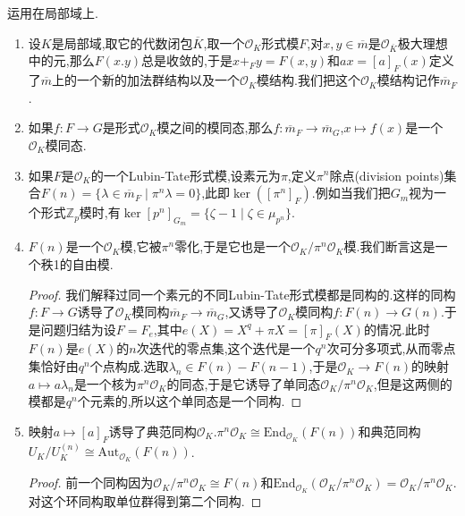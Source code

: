 运用在局部域上.
\begin{enumerate}
	\item 设$K$是局部域,取它的代数闭包$\overline{K}$,取一个$\mathscr{O}_K$形式模$F$,对$x,y\in\overline{m}$是$\mathscr{O}_{\overline{K}}$极大理想中的元,那么$F(x.y)$总是收敛的,于是$x+_Fy=F(x,y)$和$ax=[a]_F(x)$定义了$\overline{m}$上的一个新的加法群结构以及一个$\mathscr{O}_K$模结构.我们把这个$\mathscr{O}_K$模结构记作$\overline{m}_F$.
	\item 如果$f:F\to G$是形式$\mathscr{O}_K$模之间的模同态,那么$f:\overline{m}_F\to\overline{m}_G$,$x\mapsto f(x)$是一个$\mathscr{O}_K$模同态.
	\item 如果$F$是$\mathscr{O}_K$的一个Lubin-Tate形式模,设素元为$\pi$,定义$\pi^n$除点(division points)集合$F(n)=\{\lambda\in\overline{m}_F\mid\pi^n\lambda=0\}$,此即$\ker([\pi^n]_F)$.例如当我们把$G_m$视为一个形式$\mathbb{Z}_p$模时,有$\ker[p^n]_{G_m}=\{\zeta-1\mid\zeta\in\mu_{p^n}\}$.
	\item $F(n)$是一个$\mathscr{O}_K$模,它被$\pi^n$零化,于是它也是一个$\mathscr{O}_K/\pi^n\mathscr{O}_K$模.我们断言这是一个秩1的自由模.
	\begin{proof}
		
		我们解释过同一个素元的不同Lubin-Tate形式模都是同构的.这样的同构$f:F\to G$诱导了$\mathscr{O}_K$模同构$\overline{m}_F\to\overline{m}_G$,又诱导了$\mathscr{O}_K$模同构$f:F(n)\to G(n)$.于是问题归结为设$F=F_e$,其中$e(X)=X^q+\pi X=[\pi]_F(X)$的情况.此时$F(n)$是$e(X)$的$n$次迭代的零点集,这个迭代是一个$q^n$次可分多项式,从而零点集恰好由$q^n$个点构成.选取$\lambda_n\in F(n)-F(n-1)$,于是$\mathscr{O}_K\to F(n)$的映射$a\mapsto a\lambda_n$是一个核为$\pi^n\mathscr{O}_K$的同态,于是它诱导了单同态$\mathscr{O}_K/\pi^n\mathscr{O}_K$,但是这两侧的模都是$q^n$个元素的,所以这个单同态是一个同构.
	\end{proof}
	\item 映射$a\mapsto[a]_F$诱导了典范同构$\mathscr{O}_K.\pi^n\mathscr{O}_K\cong\mathrm{End}_{\mathscr{O}_K}(F(n))$和典范同构$U_K/U_K^{(n)}\cong\mathrm{Aut}_{\mathscr{O}_K}(F(n))$.
	\begin{proof}
		
		前一个同构因为$\mathscr{O}_K/\pi^n\mathscr{O}_K\cong F(n)$和$\mathrm{End}_{\mathscr{O}_K}(\mathscr{O}_K/\pi^n\mathscr{O}_K)=\mathscr{O}_K/\pi^n\mathscr{O}_K$.对这个环同构取单位群得到第二个同构.
	\end{proof}
\end{enumerate}

